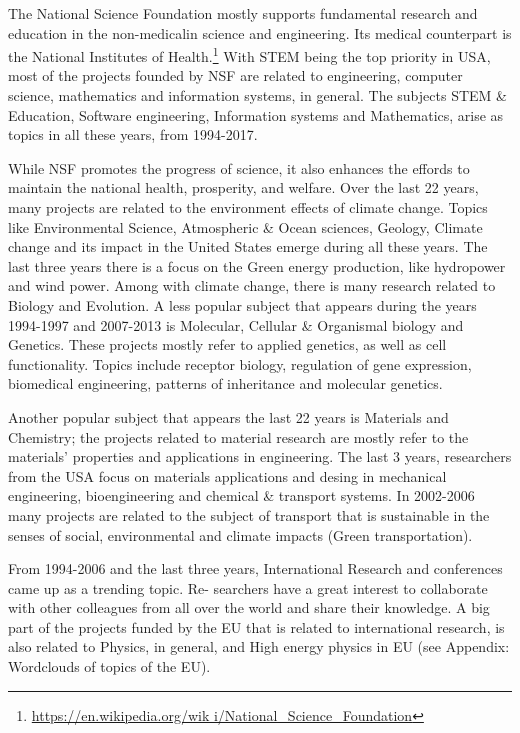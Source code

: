 \documentclass[12pt]{report}
\begin{document}
The National Science Foundation mostly supports fundamental research and
education in the non-medicalin science and engineering. Its medical counterpart
is the National Institutes of Health.\footnote{\url{https://en.wikipedia.org/wik
i/National_Science_Foundation}} With STEM being the top priority in USA, most of
the projects founded by NSF are related to engineering, computer science,
mathematics and information systems, in general. The subjects STEM \& Education,
Software engineering, Information systems and Mathematics, arise as topics in
all these years, from 1994-2017.

While NSF promotes the progress of science, it also enhances the effords to
maintain the national health, prosperity, and welfare. Over the last 22 years,
many projects are related to the environment effects of climate change. Topics
like Environmental Science, Atmospheric \& Ocean sciences, Geology, Climate
change and its impact in the United States emerge during all these years. The
last three years there is a focus on the Green energy production, like
hydropower and wind power. Among with climate change, there is many research
related to Biology and Evolution. A less popular subject that appears during the
years 1994-1997 and 2007-2013 is Molecular, Cellular \& Organismal biology and
Genetics. These projects mostly refer to applied genetics, as well as cell
functionality. Topics include receptor biology, regulation of gene expression,
biomedical engineering, patterns of inheritance and molecular genetics.

Another popular subject that appears the last 22 years is Materials and
Chemistry; the projects related to material research are mostly refer to the
materials' properties and applications in engineering. The last 3 years,
researchers from the USA focus on materials applications and desing in
mechanical engineering, bioengineering and chemical \& transport systems. In
2002-2006 many projects are related to the subject of transport that is
sustainable in the senses of social, environmental and climate impacts (Green
transportation).

From 1994-2006 and the last three years, International Research and conferences
came up as a trending topic. Re- searchers have a great interest to collaborate
with other colleagues from all over the world and share their knowledge. A big
part of the projects funded by the EU that is related to international research,
is also related to Physics, in general, and High energy physics in EU (see
Appendix: Wordclouds of topics of the EU).
\end{document}
